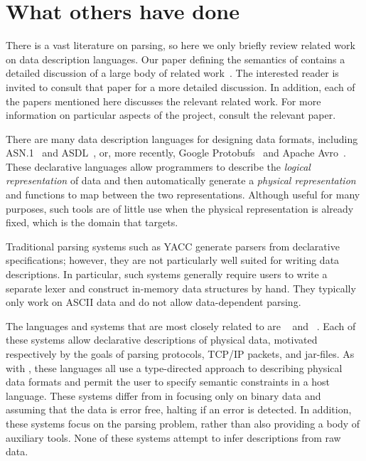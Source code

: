 \documentclass{sig-alternate}
\begin{document}
\section{What others have done}
\label{sec:related}
There is a vast literature on parsing, so here we only briefly review
related work on data description languages.  Our paper defining the
semantics of \pads{} contains a detailed discussion of a large body of
related work~\cite{Fisher+:ddca}.  The interested reader is invited to
consult that paper for a more detailed discussion.  In addition, each
of the \pads{} papers mentioned here discusses the relevant related
work.  For more information on particular aspects of the \pads{}
project, consult the relevant paper.

There are many data description languages for designing data formats,
including ASN.1~\cite{asn} and ASDL~\cite{ASDL}, or, more recently,
Google Protobufs~\cite{protobufs} and Apache Avro~\cite{avro}.  These declarative
languages allow programmers to describe the \textit{logical representation} of
data and then automatically generate a \textit{physical
  representation} and functions to map between the two representations.
Although useful for many purposes, such tools are of little use when
the physical representation is already fixed, which is the domain that
\pads{} targets.

Traditional parsing systems such as \textsc{YACC} generate parsers from
declarative specifications; however, they are not particularly well
suited for writing data descriptions.  In particular, such systems
generally require users to write a separate lexer and construct
in-memory data structures by hand.  They typically only work on ASCII
data and do not allow data-dependent parsing.

The languages and systems that are most closely related to \pads{} are
\packettypes{}~\cite{sigcomm00} and \datascript{}~\cite{gpce02}.  
Each of these systems allow declarative
descriptions of physical data, motivated respectively by the goals of
parsing protocols, \textsc{TCP/IP} packets, and \java{} jar-files.  As
with \pads{}, these languages all use a type-directed approach to
describing physical data formats and permit the user to specify
semantic constraints in a host language.  These systems differ from
\pads{} in focusing only on binary data and assuming that the data is
error free, halting if an error is detected.  In addition, these
systems focus on the parsing problem, rather than also providing a
body of auxiliary tools.  None of these systems attempt to infer
descriptions from raw data. 
\end{document}
